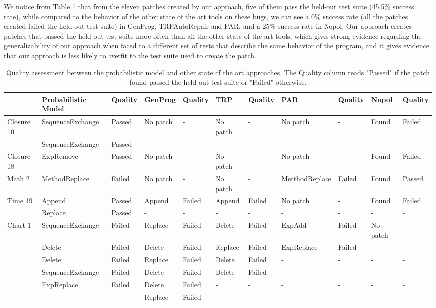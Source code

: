 \documentclass[conference]{IEEEtran}
\begin{document}
We notice from Table \ref{stateOfTheArtComparison} that from the eleven patches created by our approach, five of them pass the held-out test suite (45.5\% success rate), while compared to the behavior of the other state of the art tools on these bugs, we can see a 0\% success rate (all the patches created failed the held-out test suite) in GenProg, TRPAutoRepair and PAR, and a 25\% success rate in Nopol. Our approach creates patches that passed the held-out test suite more often than all the other state of the art tools, which gives strong evidence regarding the generalizability of our approach when faced to a different set of tests that describe the same behavior of the program, and it gives evidence that our approach is less likely to overfit to the test suite used to create the patch.


 \begin{table}[]
\centering
\label{my-label}
\begin{tabular}{l|ll|ll|ll|ll|ll}
 & Probabilistic Model & Quality & GenProg & Quality & TRP & Quality & PAR & Quality & Nopol  & Quality  \\
 \hline
Closure 10 & SequenceExchange & Passed & No patch & - & No patch & - & No patch & - & Found & Failed   \\
 & SequenceExchange & Passed & - & - & - &-  & - & - & - & -   \\
 \hline
Closure 18 & ExpRemove & Passed  & No patch & - & No patch & - & No patch & - &Found &  Failed  \\
\hline
Math 2 & MethodReplace & Failed  & No patch & - & No patch & - & MetthodReplace & Failed & Found & Passed  \\
\hline
Time 19 & Append & Passed & Append & Failed & Append & Failed & No patch & - & Found &  Failed \\
 & Replace & Passed & - & - & - & - & - & - & - & - \\
\hline
Chart 1 & SequenceExchange & Failed & Replace & Failed  & Delete & Failed & ExpAdd & Failed & No patch &   \\
 & Delete & Failed & Delete & Failed & Replace &Failed  & ExpReplace & Failed & - & -   \\
 & Delete & Failed & Replace & Failed & Delete & Failed &  -& -& - & -  \\
 & SequenceExchange & Failed & Delete & Failed & Delete &Failed  & - & - & - & -   \\
 & ExpReplace & Failed & Delete & Failed &- & - & - & - & - & -   \\
 & - & - & Replace & Failed & - & - & - & - & - & -  \\
 
\end{tabular}
\newline
\center
  \caption{Quality assessment between the probabilistic model and other state of the art approaches. The Quality column reads "Passed" if the patch found passed the held out test suite or "Failed" otherwise.}
  \label{stateOfTheArtComparison}
\end{table}
\end{document}
